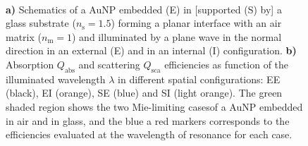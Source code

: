 \begin{figure}[h!]
    \hspace*{-19.15em}%
    \vspace*{-1.25em}%
        \begin{subfigure}{.385\textwidth}\caption{ }\label{sfig:TotallyNormal:1}\end{subfigure}%
        \begin{subfigure}{.25\textwidth}\caption{ }\label{sfig:TotallyNormal:2}\end{subfigure} \\
    \def\svgwidth{.95\textwidth}
    \small
    \centering
    \vspace*{0em}
    \caption[Absorption and Scattering Efficiencies of a 12.5 nm AuNP above and below a planar Interface Illuminated at Normal Incidence]{\textbf{a)} Schematics of a AuNP embedded (E) in [supported (S) by] a glass substrate ($n_\text{s} = 1.5$) forming a planar interface with an air matrix ($n_\text{m} = 1$) and illuminated by a plane wave in the normal direction in an external (E) and in an internal (I) configuration. \textbf{b)} Absorption $Q_\text{abs}$ and scattering $Q_\text{sca}$ efficiencies as function of the illuminated wavelength $\lambda$ in different spatial configurations: EE (black), EI (orange), SE (blue) and SI (light orange). The green shaded region shows the two Mie-limiting casesof a  AuNP embedded
     in air and in glass, and the blue a red markers corresponds to the efficiencies evaluated at the wavelength of resonance for each case.
    }
\label{fig:TotallyNormal}
\end{figure}

